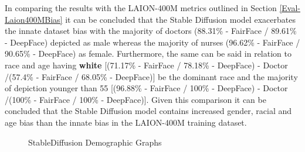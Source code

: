 In comparing the results with the LAION-400M metrics outlined in Section \ref{Eval-Laion400MBias} it can be concluded that the Stable Diffusion model exacerbates the innate dataset bias with the majority of doctors (88.31\% - FairFace / 89.61\% - DeepFace) depicted as male whereas the majority of nurses (96.62\% - FairFace / 90.65\% - DeepFace) as female. Furthermore, the same can be said in relation to race and age having \textbf{white} [(71.17\% - FairFace / 78.18\% - DeepFace) - Doctor /(57.4\% - FairFace / 68.05\% - DeepFace)] be the dominant race and the majority of depiction younger than 55 [(96.88\% - FairFace / 100\% - DeepFace) - Doctor /(100\% - FairFace / 100\% - DeepFace)]. Given this comparison it can be concluded that the Stable Diffusion model contains increased gender, racial and age bias than the innate bias in the LAION-400M training dataset.

\begin{figure}[H]
\centering  
{}

\caption{StableDiffusion Demographic Graphs}\label{fig:StableDiffusion-Demographic-Graphs}
\end{figure}

